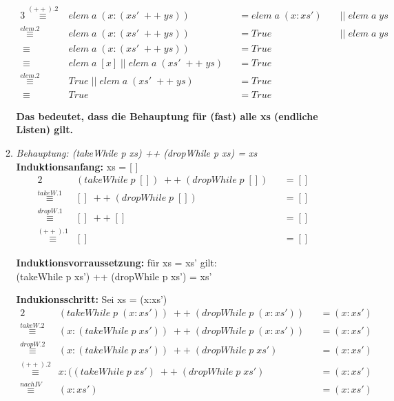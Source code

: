 \documentclass[11pt]{article}
\begin{document}
\begin{enumerate}
\begin{enumerate}
\begin{alignat*}{3}
\stackrel{(++).2}{\equiv}&elem\phantom{.}a\phantom{.}(x:(xs'\phantom{.}++\phantom{.}ys))&&=elem\phantom{.}a\phantom{.}(x:xs')\phantom{.}&&||\phantom{.}elem\phantom{.}a\phantom{.}ys\\
\stackrel{elem.2}{\equiv}&elem\phantom{.}a\phantom{.}(x:(xs'\phantom{.}++\phantom{.}ys))&&=True\phantom{.}&&||\phantom{.}elem\phantom{.}a\phantom{.}ys\\
\equiv\phantom{.}&elem\phantom{.}a\phantom{.}(x:(xs'\phantom{.}++\phantom{.}ys))&&=True &&\\
\equiv\phantom{.}&elem\phantom{.}a\phantom{.}[x]\phantom{.}||\phantom{.}elem\phantom{.}a\phantom{.}(xs'\phantom{.}++\phantom{.}ys)&&=True &&\\
\stackrel{elem.2}{\equiv}&True\phantom{.}||\phantom{.}elem\phantom{.}a\phantom{.}(xs'\phantom{.}++\phantom{.}ys)&&=True&&\\
\equiv\phantom{.}&True&&=True
\end{alignat*}

\vspace*{0.5cm}
\textbf{Das bedeutet, dass die Behauptung für (fast) alle xs (endliche Listen) gilt.}

\vspace*{0.5cm}
\item
\textit{Behauptung: (takeWhile p xs) ++ (dropWhile p xs) = xs}\\
\textbf{Induktionsanfang:} xs = [ ]
\begin{alignat*}{2}
&(takeWhile\phantom{.}p\phantom{.}[])\phantom{.}++\phantom{.}(dropWhile\phantom{.}p\phantom{.}[])&&=[]\\
\stackrel{takeW.1}{\equiv}&[]\phantom{.}++\phantom{.}(dropWhile\phantom{.}p\phantom{.}[])&&=[]\\
\stackrel{dropW.1}{\equiv}&[]\phantom{.}++\phantom{.}[]&&=[]\\
\stackrel{(++).1}{\equiv}&[]&&=[]
\end{alignat*}

\newpage
\textbf{Induktionsvorraussetzung:} für xs = xs' gilt:\\
(takeWhile p xs') ++ (dropWhile p xs') = xs'

\vspace*{0.5cm}
\textbf{Indukionsschritt:} Sei xs = (x:xs')
\begin{alignat*}{2}
&(takeWhile\phantom{.}p\phantom{.}(x:xs'))\phantom{.}++\phantom{.}(dropWhile\phantom{.}p\phantom{.}(x:xs'))&&=(x:xs')\\
\stackrel{takeW.2}{\equiv}&(x:(takeWhile\phantom{.}p\phantom{.}xs'))\phantom{.}++\phantom{.}(dropWhile\phantom{.}p\phantom{.}(x:xs'))&&=(x:xs')\\
\stackrel{dropW.2}{\equiv}&(x:(takeWhile\phantom{.}p\phantom{.}xs'))\phantom{.}++\phantom{.}(dropWhile\phantom{.}p\phantom{.}xs')&&=(x:xs')\\
\stackrel{(++).2}{\equiv}&x:((takeWhile\phantom{.}p\phantom{.}xs')\phantom{.}++\phantom{.}(dropWhile\phantom{.}p\phantom{.}xs')&&=(x:xs')\\
\stackrel{nach IV}{\equiv}&(x:xs')&&=(x:xs')
\end{alignat*}


\end{enumerate}
\end{enumerate}
\end{document}
